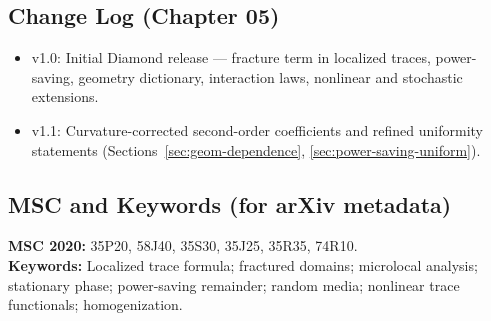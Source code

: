 \subsection{Change Log (Chapter 05)}
\label{subsec:05-changelog}
\begin{itemize}
  \item v1.0: Initial Diamond release — fracture term in localized traces, power-saving,
  geometry dictionary, interaction laws, nonlinear and stochastic extensions.
  \item v1.1: Curvature-corrected second-order coefficients and refined uniformity
  statements (Sections~\ref{sec:geom-dependence}, \ref{sec:power-saving-uniform}).
\end{itemize}

\subsection{MSC and Keywords (for arXiv metadata)}
\label{subsec:05-metadata}
\noindent\textbf{MSC 2020:}
35P20, 58J40, 35S30, 35J25, 35R35, 74R10.\\
\textbf{Keywords:}
Localized trace formula; fractured domains; microlocal analysis; stationary phase;
power-saving remainder; random media; nonlinear trace functionals; homogenization.

